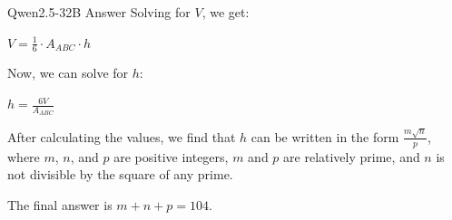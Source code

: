 \begin{answerbox}{Qwen2.5-32B Answer}
Solving for $V$, we get:

$V = \frac{1}{6} \cdot A_{ABC} \cdot h$

Now, we can solve for $h$:

$h = \frac{6V}{A_{ABC}}$

After calculating the values, we find that $h$ can be written in the form $\frac{m \sqrt n}{p}$, where $m$, $n$, and $p$ are positive integers, $m$ and $p$ are relatively prime, and $n$ is not divisible by the square of any prime.

The final answer is $m + n + p = \boxed{104}$.


\end{answerbox}




